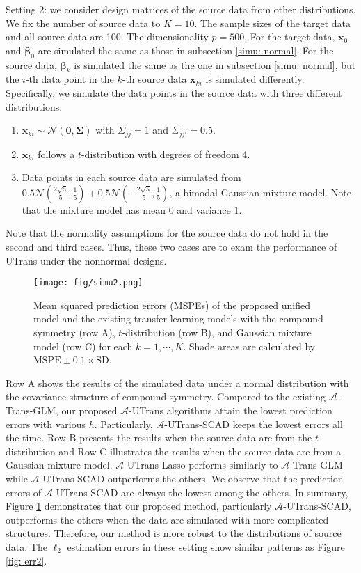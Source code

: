 \documentclass[twoside,12pt]{article}
\newcommand{\mb}[1]{\boldsymbol{\mathbf{#1}}}
\begin{document}
Setting 2: we consider design matrices of the source data from other distributions.
We fix the number of source data to $K=10$.
The sample sizes of the target data and all source data are 100.
The dimensionality $p=500$.
For the target data, $\mb x_0$ and $\mb\beta_0$ are simulated the same as those in subsection \ref{simu: normal}.
For the source data, $\mb\beta_k$ is simulated the same as the one in subsection \ref{simu: normal}, but the $i$-th data point in the $k$-th source data $\mb x_{ki}$ is simulated differently.
Specifically, we simulate the data points in the source data with three different distributions:
\begin{enumerate}%
	\item $\mb x_{ki}\sim \mathcal{N}(\mb 0, \mb\Sigma)$ with  $\Sigma_{jj}=1$ and $\Sigma_{jj'}=0.5$. 
	\item $\mb x_{ki}$ follows a $t$-distribution with degrees of freedom 4.
	\item Data points in each source data are simulated from $0.5 \mathcal{N}(\frac{2\sqrt{5}}{5}, \frac15)+0.5 \mathcal{N}(-\frac{2\sqrt{5}}{5}, \frac15)$, a bimodal Gaussian mixture model.
	Note that the mixture model has mean 0 and variance 1.
\end{enumerate}
Note that the normality assumptions for the source data do not hold in the second and third cases.
Thus, these two cases are to exam the performance of UTrans under the nonnormal designs.

\begin{figure}[hbt!]
	\centering
	\texttt{[image: fig/simu2.png]}
	\caption{Mean squared prediction errors (MSPEs) of the proposed unified model and the existing transfer learning models with the compound symmetry (row A), $t$-distribution (row B), and Gaussian mixture model (row C) for each $k=1,\cdots,K$. Shade areas are calculated by $\text{MSPE}\pm 0.1\times \text{SD}$.}
	\label{fig: other}
\end{figure}


Row A shows the results of the simulated data under a normal distribution with the covariance structure of compound symmetry.
Compared to the existing $\mathcal A$-Trans-GLM, our proposed $\mathcal A$-UTrans algorithms attain the lowest prediction errors with various $h$.
Particularly, $\mathcal A$-UTrans-SCAD keeps the lowest errors all the time.
Row B presents the results when the source data are from the $t$-distribution and Row C illustrates the results when the source data are from a Gaussian mixture model.
$\mathcal A$-UTrans-Lasso performs similarly to $\mathcal A$-Trans-GLM while $\mathcal A$-UTrans-SCAD outperforms the others.
We observe that the prediction errors of $\mathcal A$-UTrans-SCAD are always the lowest among the others. 
In summary, Figure \ref{fig: other} demonstrates that our proposed method, particularly $\mathcal A$-UTrans-SCAD, outperforms the others when the data are simulated with more complicated structures.
Therefore, our method is more robust to the distributions of source data.
The $\ell_2$ estimation errors in these setting show similar patterns as Figure \ref{fig: err2}.
\end{document}
